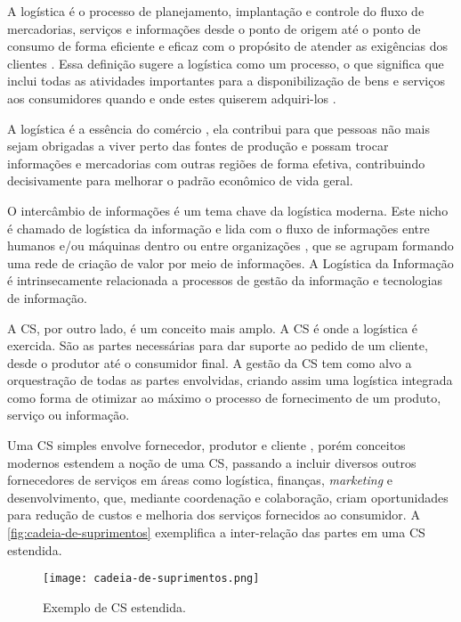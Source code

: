 A logística é o processo de planejamento, implantação e controle do fluxo de mercadorias, serviços e informações desde o ponto de origem até o ponto de consumo de forma eficiente e eficaz com o propósito de atender as exigências dos clientes \cite{cscmp2013supplychainglossary}. Essa definição sugere a logística como um processo, o que significa que inclui todas as atividades importantes para a disponibilização de bens e serviços aos consumidores quando e onde estes quiserem adquiri-los \cite{ballou2006cadeiasuprimentos}.

A logística é a essência do comércio \cite{ballou2006cadeiasuprimentos}, ela contribui para que pessoas não mais sejam obrigadas a viver perto das fontes de produção e possam trocar informações e mercadorias com outras regiões de forma efetiva, contribuindo decisivamente para melhorar o padrão econômico de vida geral.

O intercâmbio de informações é um tema chave da logística moderna. Este nicho é chamado de logística da informação e lida com o fluxo de informações entre humanos e/ou máquinas dentro ou entre organizações \cite{haftor2011information}, que se agrupam formando uma rede de criação de valor por meio de informações. A Logística da Informação é intrinsecamente relacionada a processos de gestão da informação e tecnologias de informação.

A CS, por outro lado, é um conceito mais amplo. A CS é onde a logística é exercida. São as partes necessárias para dar suporte ao pedido de um cliente, desde o produtor até o consumidor final. A gestão da CS tem como alvo a orquestração de todas as partes envolvidas, criando assim uma logística integrada como forma de otimizar ao máximo o processo de fornecimento de um produto, serviço ou informação.

Uma CS simples envolve fornecedor, produtor e cliente \cite{hugos2018supplychain}, porém conceitos modernos estendem a noção de uma CS, passando a incluir diversos outros fornecedores de serviços em áreas como logística, finanças, \textit{marketing} e desenvolvimento, que, mediante coordenação e colaboração, criam oportunidades para redução de custos e melhoria dos serviços fornecidos ao consumidor. A \autoref{fig:cadeia-de-suprimentos} exemplifica a inter-relação das partes em uma CS estendida.

\begin{figure}[htb]
	\centering
	\texttt{[image: cadeia-de-suprimentos.png]}
	\caption{Exemplo de CS estendida.}
	\label{fig:cadeia-de-suprimentos}
\end{figure}

